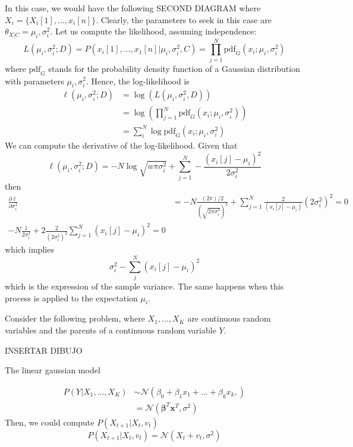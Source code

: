 In this case, we would have the following SECOND DIAGRAM
where \(X_{i} = \{X_{i}[1],\dots,x_{i}[n]\}\). Clearly, the parameters to seek in this case are \(\theta_{X|C} = \mu_{i},\sigma_{i}^{2}\). Let us compute the likelihood, assuming independence:
\[
  L(\mu_{i},\sigma_{i}^{2}; D) = P(x_{i}[1],\dots,x_{1}[n]|\mu_{i},\sigma_{i}^{2},C) = \prod_{j=1}^{N} \text{pdf}_{G}(x_{i}; \mu_{i}, \sigma_{i}^{2})
\]
where \(\text{pdf}_{G}\) stands for the probability density function of a Gaussian distribution with parameters \(\mu_{i},\sigma_{i}^{2}\). Hence, the log-likelihood is
\begin{align*}
  \ell(\mu_{i},\sigma_{i}^{2}; D) & = \log \left( L(\mu_{i},\sigma_{i}^{2}, D)\right) \\
                                  & = \log \left(  \prod_{j=1}^{N} \text{pdf}_{G}(x_{i}; \mu_{i}, \sigma_{i}^{2}) \right) \\
  & = \sum_{i}^{N} \log \text{pdf}_{G}(x_{i}; \mu_{i},\sigma_{i}^{2})
\end{align*}
We can compute the derivative of the log-likelihood. Given that
\[
\ell(\mu_{i},\sigma_{i}^{2};D) = - N \log \sqrt{w\pi \sigma_{i}^{2}} + \sum_{j=1}^{N}-\frac{(x_{i}[j]-\mu_{i})^{2}}{2\sigma_{i}^{2}}
\]
then
\begin{align*}
  \frac{\partial \ell}{\partial \sigma_{i}^{2}} & = - N \frac{(2 \pi)/2 }{\left(\sqrt{2\pi \sigma_{i}^{2}}\right)^{2}}  + \sum_{j=1}^{N} \frac{2}{(x_{i}[j] - \mu_{i})}{(2\sigma_{i}^{2})^{2}} = 0 \\
  -N \frac{1}{2 \sigma_{i}^{2}} + 2 \frac{2}{(2\sigma_{i}^{2})^{2}} \sum_{j=1}^{N}(x_{i}[j] - \mu_{i})^{2} = 0
\end{align*}
which implies
\[
\sigma_{i}^{2}- \sum_{j}^{N}(x_{i}[j] - \mu_{i})^{2}
\]
which is the expression of the sample variance. The same happens when this process is applied to the expectation \(\mu_{i}\).


Consider the following problem, where \(X_{1},\dots, X_{K}\) are continuous random variables and the parents of a continuous random variable \(Y\).

INSERTAR DIBUJO

The linear gaussian model

\begin{align*}
  P(Y|X_{1},\dots, X_{K}) & \sim \mathcal N \left( \beta_{0} + \beta_{1}x_{1} + \dots + \beta_{k}x_{k},\right)\\
  &  = \mathcal N ( \mathbf{\beta}^{T} \mathbf{x}^{T}, \sigma^{2} )
\end{align*}
Then, we could compute \(P(X_{t+1}|X_{t},v_{t})\)
\[
P(X_{t+1}|X_{t},v_{t}) = \mathcal N (X_{t} + v_{t},\sigma^{2})
\]

